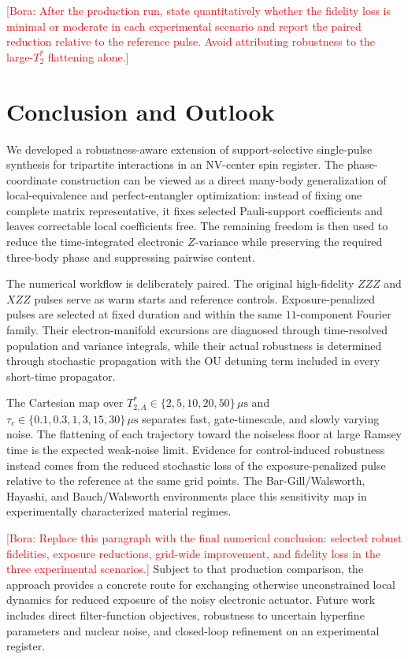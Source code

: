 \documentclass[
  aps,
  pra,
  reprint,            %
  superscriptaddress, %
  amsmath,amssymb,
  notitlepage
]{revtex4-2}
\newcommand{\bb}[1]{\textcolor{red}{[Bora: #1]}}
\begin{document}
\bb{After the production run, state quantitatively whether the fidelity loss is minimal or moderate in each experimental scenario and report the paired reduction relative to the reference pulse. Avoid attributing robustness to the large-$T_2^*$ flattening alone.}

\section{Conclusion and Outlook}
\label{sec:conclusion}

We developed a robustness-aware extension of support-selective single-pulse synthesis for tripartite interactions in an NV-center spin register. The phase-coordinate construction can be viewed as a direct many-body generalization of local-equivalence and perfect-entangler optimization: instead of fixing one complete matrix representative, it fixes selected Pauli-support coefficients and leaves correctable local coefficients free. The remaining freedom is then used to reduce the time-integrated electronic $Z$-variance while preserving the required three-body phase and suppressing pairwise content.

The numerical workflow is deliberately paired. The original high-fidelity $ZZZ$ and $XZZ$ pulses serve as warm starts and reference controls. Exposure-penalized pulses are selected at fixed duration and within the same $11$-component Fourier family. Their electron-manifold excursions are diagnosed through time-resolved population and variance integrals, while their actual robustness is determined through stochastic propagation with the OU detuning term included in every short-time propagator.

The Cartesian map over $T_{2,A}^{\ast}\in\{2,5,10,20,50\}\,\mu\mathrm{s}$ and $\tau_c\in\{0.1,0.3,1,3,15,30\}\,\mu\mathrm{s}$ separates fast, gate-timescale, and slowly varying noise. The flattening of each trajectory toward the noiseless floor at large Ramsey time is the expected weak-noise limit. Evidence for control-induced robustness instead comes from the reduced stochastic loss of the exposure-penalized pulse relative to the reference at the same grid points. The Bar-Gill/Walsworth, Hayashi, and Bauch/Walsworth environments place this sensitivity map in experimentally characterized material regimes.

\bb{Replace this paragraph with the final numerical conclusion: selected robust fidelities, exposure reductions, grid-wide improvement, and fidelity loss in the three experimental scenarios.} Subject to that production comparison, the approach provides a concrete route for exchanging otherwise unconstrained local dynamics for reduced exposure of the noisy electronic actuator. Future work includes direct filter-function objectives, robustness to uncertain hyperfine parameters and nuclear noise, and closed-loop refinement on an experimental register.
\end{document}
